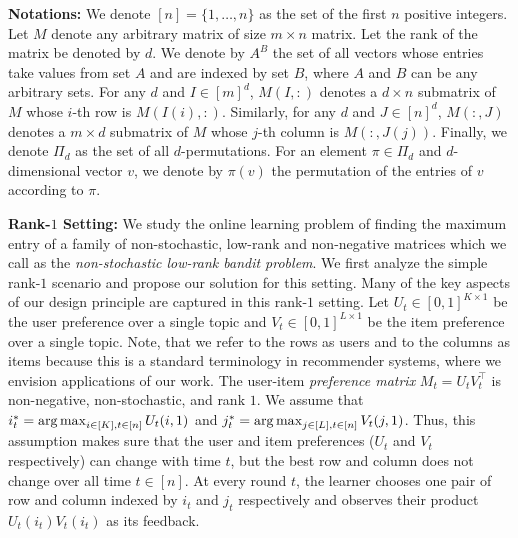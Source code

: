 
\newcommand{\transpose}{^\mathsf{\scriptscriptstyle T}}
\textbf{Notations:} We denote $[n] = \{1, \dots, n\}$ as the set of the first $n$ positive integers. Let $M$ denote any arbitrary matrix of size $m \times n$ matrix. Let the rank of the matrix be denoted by $d$. We denote by $A^B$ the set of all vectors whose entries take values from set $A$ and are indexed by set $B$, where $A$ and $B$ can be any arbitrary sets. For any $d$ and $I \in [m]^d$, $M(I, :)$ denotes a $d \times n$ submatrix of $M$ whose $i$-th row is $M(I(i), :)$. Similarly, for any $d$ and $J \in [n]^d$, $M(:, J)$ denotes a $m \times d$ submatrix of $M$ whose $j$-th column is $M(:, J(j))$. Finally, we denote $\Pi_d$ as the set of all $d$-permutations. For an element $\pi \in \Pi_d$ and $d$-dimensional vector $v$, we denote by $\pi(v)$ the permutation of the entries of $v$ according to $\pi$.

\textbf{Rank-$1$ Setting:} We study the online learning problem of finding the maximum entry of a family of non-stochastic, low-rank and non-negative matrices  which we call as the \emph{non-stochastic low-rank bandit problem}. We first analyze the simple rank-$1$ scenario and propose our solution for this setting. Many of the key aspects of our design principle are captured in this rank-$1$ setting. Let $U_t\in [0,1]^{K\times 1}$ be the user preference over a single topic and $V_t \in [0,1]^{L\times 1}$ be the item preference over a single topic. Note, that we refer to the rows as users and to the columns as items because this is a standard terminology in recommender systems, where we envision applications of our work. The user-item \emph{preference matrix} $M_t = U_tV_t^{\intercal}$ is non-negative, non-stochastic, and rank $1$. We assume that $i^\ast_t = \mathop{\rm arg\,max}_{i\in[K], t\in[n]}U_t(i,1)$ and  $j^\ast_t = \mathop{\rm arg\,max}_{j\in[L], t\in[n]}V_t(j,1)$. Thus, this assumption makes sure that the user and item preferences ($U_t$ and $V_t$ respectively) can change with time $t$, but the best row and column does not change over all time $t\in[n]$. At every round $t$, the learner chooses one pair of row and column indexed by $i_t$ and $j_t$ respectively and observes their product $U_t(i_t)V_t(i_t)$ as its feedback.

